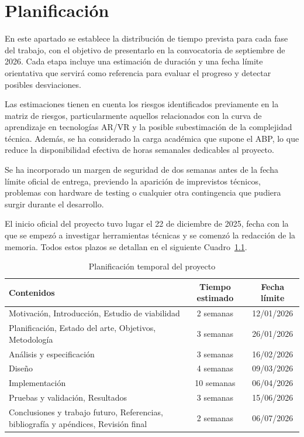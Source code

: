 \chapter{\label{planificacion}Planificación}


En este apartado se establece la distribución de tiempo prevista para cada fase del trabajo, con el objetivo de presentarlo en la convocatoria de septiembre de 2026. Cada etapa incluye una estimación de duración y una fecha límite orientativa que servirá como referencia para evaluar el progreso y detectar posibles desviaciones.

Las estimaciones tienen en cuenta los riesgos identificados previamente en la matriz de riesgos, particularmente aquellos relacionados con la curva de aprendizaje en tecnologías AR/VR y la posible subestimación de la complejidad técnica. Además, se ha considerado la carga académica que supone el ABP, lo que reduce la disponibilidad efectiva de horas semanales dedicables al proyecto.

Se ha incorporado un margen de seguridad de dos semanas antes de la fecha límite oficial de entrega, previendo la aparición de imprevistos técnicos, problemas con hardware de testing o cualquier otra contingencia que pudiera surgir durante el desarrollo.

El inicio oficial del proyecto tuvo lugar el 22 de diciembre de 2025, fecha con la que se empezó a investigar herramientas técnicas y se comenzó la redacción de la memoria. Todos estos plazos se detallan en el siguiente Cuadro~\ref{tab:planificacion-temporal}. 


\begin{table}[!htb]
\centering
\caption{Planificación temporal del proyecto}
\label{tab:planificacion-temporal}
\begin{tabular}{p{8cm}cc}
\toprule
\textbf{Contenidos} & \textbf{Tiempo estimado} & \textbf{Fecha límite} \\
\midrule
Motivación, Introducción, Estudio de viabilidad & 2 semanas & 12/01/2026 \\
\addlinespace
Planificación, Estado del arte, Objetivos, Metodología & 3 semanas & 26/01/2026 \\
\addlinespace
Análisis y especificación & 3 semanas & 16/02/2026 \\
\addlinespace
Diseño & 4 semanas & 09/03/2026 \\
\addlinespace
Implementación & 10 semanas & 06/04/2026 \\
\addlinespace
Pruebas y validación, Resultados & 3 semanas & 15/06/2026 \\
\addlinespace
Conclusiones y trabajo futuro, Referencias, bibliografía y apéndices, Revisión final & 2 semanas & 06/07/2026 \\
\bottomrule
\end{tabular}
\end{table}




